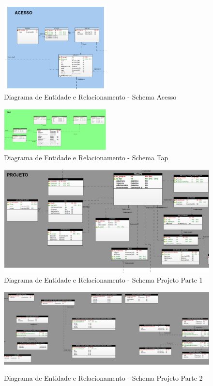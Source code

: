 \documentclass{acm_proc_article-sp}
\begin{document}
\begin{appendices}
\begin{figure}[h]
\centering %
\includegraphics[width=0.5\textwidth]{DER_acesso.jpg} %
\caption{Diagrama de Entidade e Relacionamento - Schema Acesso}
\end{figure} 

\begin{figure}[h]
\centering %
\includegraphics[width=0.5\textwidth]{DER_tap.jpg} %
\caption{Diagrama de Entidade e Relacionamento - Schema Tap}
\end{figure}

\begin{figure}[h]
\centering %
\includegraphics[width=1\textwidth]{DER_projeto_p1.jpg} %
\caption{Diagrama de Entidade e Relacionamento - Schema Projeto Parte 1}
\end{figure}

\begin{figure}[h]
\centering %
\includegraphics[width=1\textwidth]{DER_projeto_p2.jpg} %
\caption{Diagrama de Entidade e Relacionamento - Schema Projeto Parte 2}
\end{figure}


\end{appendices}
\end{document}

